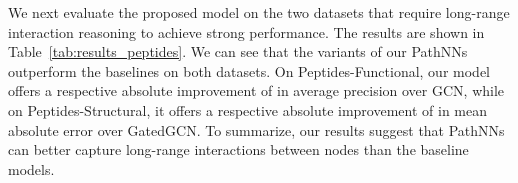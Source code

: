 \documentclass{article}
\theoremstyle{plain}
\theoremstyle{definition}
\theoremstyle{remark}
\begin{document}
\begin{table}[t]
\centering
\caption{Results on the Peptides-Functional and Peptides-Structural datasets ( standard deviation). Evaluation metrics are Average Precision and Mean Absolute Error, respectively. Best performance is highlighted in \textbf{bold}. Parameter budget is set to K parameters. Results are averaged over  random seeds.}
\label{tab:results_peptides}
\renewcommand{\arraystretch}{1.2}
\end{table}

We next evaluate the proposed model on the two datasets that require long-range interaction reasoning to achieve strong performance.
The results are shown in Table~\ref{tab:results_peptides}.
We can see that the variants of our PathNNs outperform the baselines on both datasets.
On Peptides-Functional, our model offers a respective absolute improvement of  in average precision over GCN, while on Peptides-Structural, it offers a respective absolute improvement of  in mean absolute error over GatedGCN.
To summarize, our results suggest that PathNNs can better capture long-range interactions between nodes than the baseline models.
\end{document}
